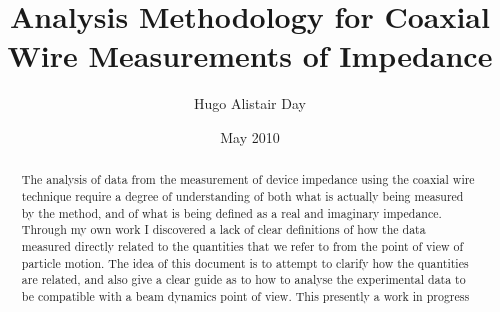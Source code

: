 \documentclass[12pt,a4paper,twopage,openright]{article}
\begin{document}
%
\title{Analysis Methodology for Coaxial Wire Measurements of Impedance}
\author{Hugo Alistair Day}
\date{May 2010}
\maketitle


\begin{abstract}
The analysis of data from the measurement of device impedance using the coaxial wire technique require a degree of understanding of both what is actually being measured by the method, and of what is being defined as a real and imaginary impedance. Through my own work I discovered a lack of clear definitions of how the data measured directly related to the quantities that we refer to from the point of view of particle motion. The idea of this document is to attempt to clarify how the quantities are related, and also give a clear guide as to how to analyse the experimental data to be compatible with a beam dynamics point of view. This presently a work in progress
\end{abstract}

\newpage

\tableofcontents

%










\end{document}
